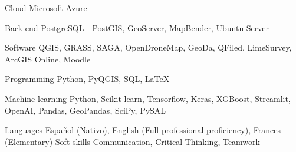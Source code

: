 

\begin{cvskills}

  \cvskill
    {Cloud} %
    {Microsoft Azure} %

  \cvskill
    {Back-end} %
    {PostgreSQL - PostGIS, GeoServer, MapBender, Ubuntu Server} %

  \cvskill
    {Software} %
    {QGIS, GRASS, SAGA, OpenDroneMap, GeoDa, QFiled, LimeSurvey,
    ArcGIS Online, Moodle} %

  \cvskill
    {Programming} %
    {Python, PyQGIS, SQL, \LaTeX} %

  \cvskill
    {Machine learning} %
    {Python, Scikit-learn, Tensorflow, Keras, XGBoost, Streamlit, OpenAI, Pandas,
    GeoPandas, SciPy, PySAL} %

  \cvskill
    {Languages} %
    {Español (Nativo),
    English (Full professional proficiency),
    Frances (Elementary)} %
  \cvskill
    {Soft-skills} %
    {Communication,
    Critical Thinking,
    Teamwork} %

\end{cvskills}
